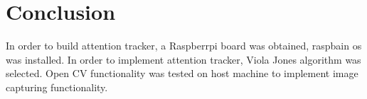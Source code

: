 \section{Conclusion}
In order to build attention tracker, a Raspberrpi board was obtained, raspbain os was installed. In order to implement attention tracker, Viola Jones algorithm was selected. Open CV functionality was tested on host machine to implement image capturing functionality. 
